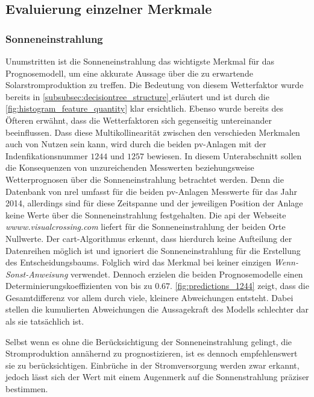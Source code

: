 \documentclass[12pt, a4paper]{article}
\newcommand*{\fullref}[1]{\hyperref[{#1}]{\autoref*{#1} \textit{\nameref*{#1}}}}
\begin{document}
\subsection{Evaluierung einzelner Merkmale}

\subsubsection{Sonneneinstrahlung}

Unumstritten ist die Sonneneinstrahlung das wichtigste Merkmal für das Prognosemodell, um eine akkurate Aussage über die zu erwartende Solarstromproduktion zu treffen. Die Bedeutung von diesem Wetterfaktor wurde bereits in \fullref{subsubsec:decisiontree_structure} erläutert und ist durch die \autoref{fig:histogram_feature_quantity} klar ersichtlich. Ebenso wurde bereits des Öfteren erwähnt, dass die Wetterfaktoren sich gegenseitig untereinander beeinflussen. Dass diese Multikollinearität zwischen den verschieden Merkmalen auch von Nutzen sein kann, wird durch die beiden \ac{pv}-Anlagen mit der Indenfikationsnummer $1244$ und $1257$ bewiesen. In diesem Unterabschnitt sollen die Konsequenzen von unzureichenden Messwerten beziehungsweise Wetterprognosen über die Sonneneinstrahlung betrachtet werden. Denn die Datenbank von \ac{nrel} umfasst für die beiden \ac{pv}-Anlagen Messwerte für das Jahr 2014, allerdings sind für diese Zeitspanne und der jeweiligen Position der Anlage keine Werte über die Sonneneinstrahlung festgehalten. Die \ac{api} der Webseite \textit{wwww.visualcrossing.com} liefert für die Sonneneinstrahlung der beiden Orte Nullwerte. Der \ac{cart}-Algorithmus erkennt, dass hierdurch keine Aufteilung der Datenreihen möglich ist und ignoriert die Sonneneinstrahlung für die Erstellung des Entscheidungsbaums. Folglich wird das Merkmal bei keiner einzigen \textit{Wenn-Sonst-Anweisung} verwendet. Dennoch erzielen die beiden Prognosemodelle einen Determinierungskoeffizienten von bis zu $0.67$. \autoref{fig:predictions_1244} zeigt, dass die Gesamtdifferenz vor allem durch viele, kleinere Abweichungen entsteht. Dabei stellen die kumulierten Abweichungen die Aussagekraft des Modells schlechter dar als sie tatsächlich ist. 

Selbst wenn es ohne die Berücksichtigung der Sonneneinstrahlung gelingt, die Stromproduktion annähernd zu prognostizieren, ist es dennoch empfehlenswert sie zu berücksichtigen. Einbrüche in der Stromversorgung werden zwar erkannt, jedoch lässt sich der Wert mit einem Augenmerk auf die Sonnenstrahlung präziser bestimmen.
\end{document}
